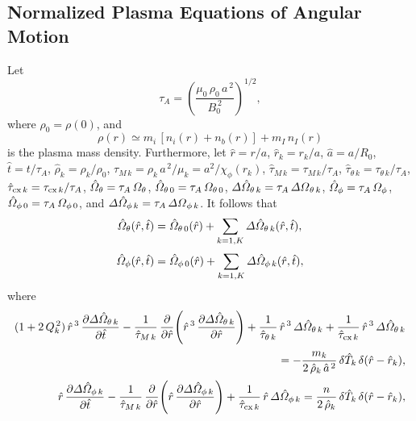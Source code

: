 \documentclass[notitlepage,12pt]{article}
\begin{document}
\subsection{Normalized Plasma Equations of Angular Motion}
Let 
\begin{equation}
\tau_A = \left(\frac{\mu_0\,\rho_0\,a^{\,2}}{B_0^{\,2}}\right)^{1/2},
\end{equation}
where
 $\rho_0=\rho(0)$,
 and
\begin{equation}
\rho(r)
\simeq  m_i\,[n_i(r)+n_b(r)] + m_I\,n_I(r)
\end{equation}
 is the plasma mass density.  
  Furthermore, let $\hat{r}=r/a$, $\hat{r}_k=r_k/a$, $\hat{a}=a/R_0$, $\hat{t}=t/\tau_A$, $\hat{\rho}_k=\rho_k/\rho_0$, $\tau_{M\,k} = \rho_k\,a^{\,2}/\mu_k= a^2/\chi_\phi(r_k)$, $\hat{\tau}_{M\,k}= \tau_{M\,k}/\tau_A$, 
$\hat{\tau}_{\theta\,k}=\tau_{\theta\,k}/\tau_A$, $
\hat{\tau}_{{\rm cx}\,k}=\tau_{{\rm cx}\,k}/\tau_A$, $\hat{\mit\Omega}_\theta=\tau_A\,{\mit\Omega}_\theta$, $\hat{\mit\Omega}_{\theta\,0}=\tau_A\,{\mit\Omega}_{\theta\,0}$,
${\mit\Delta}\hat{\mit\Omega}_{\theta\,k} = \tau_A\,{\mit\Delta\Omega}_{\theta\,k}$, $\hat{\mit\Omega}_\phi=\tau_A\,{\mit\Omega}_\phi$, $\hat{\mit\Omega}_{\phi\,0}=\tau_A\,{\mit\Omega}_{\phi\,0}$,
and 
${\mit\Delta}\hat{\mit\Omega}_{\phi\,k} = \tau_A\,{\mit\Delta\Omega}_{\phi\,k}$. It follows that
\begin{align}
\hat{\mit\Omega}_\theta(\hat{r},\hat{t}) &=\hat{\mit\Omega}_{\theta\,0}(\hat{r}) + \sum_{k=1,K}{\mit\Delta}\hat{\mit\Omega}_{\theta\,k}(\hat{r},\hat{t}),\\[0.5ex]
\hat{\mit\Omega}_\phi(\hat{r},\hat{t}) &=\hat{\mit\Omega}_{\phi\,0}(\hat{r}) + \sum_{k=1,K}{\mit\Delta}\hat{\mit\Omega}_{\phi\,k}(\hat{r},\hat{t}),
\end{align}
where
\begin{align}
(1+2\,Q_k^{\,2})\,\hat{r}^{\,3}\,\frac{\partial{\mit\Delta}\hat{\mit\Omega}_{\theta\,k}}{\partial \hat{t}}-\frac{1}{\hat{\tau}_{M\,k}}\,\frac{\partial}{\partial \hat{r}}\!\left(
\hat{r}^{\,3}\,\frac{\partial{\mit\Delta}\hat{\mit\Omega}_{\theta\,k}}{\partial \hat{r}}\right) +\frac{1}{\hat{\tau}_{\theta\,k}}\,\hat{r}^{\,3}\,{\mit\Delta}\hat{\mit\Omega}_{\theta\,k}+\frac{1}{\hat{\tau}_{{\rm cx}\,k}}\,\hat{r}^{\,3}\,{\mit\Delta}\hat{\mit\Omega}_{\theta\,k}\nonumber\\[0.5ex]\phantom{==}=-\frac{m_k}{2\,\hat{\rho}_k\,\hat{a}^{\,2}}\,\delta\hat{T}_k\,\delta (\hat{r}-\hat{r}_k),\label{exxx}\\[0.5ex]
\hat{r}\,\frac{\partial{\mit\Delta}\hat{\mit\Omega}_{\phi\,k}}{\partial \hat{t}}-\frac{1}{\hat{\tau}_{M\,k}}\,\frac{\partial}{\partial \hat{r}}\!\left(
\hat{r}\,\frac{\partial{\mit\Delta}\hat{\mit\Omega}_{\phi\,k}}{\partial \hat{r}}\right) +\frac{1}{\hat{\tau}_{{\rm cx}\,k}}\,\hat{r}\,{\mit\Delta}\hat{\mit\Omega}_{\phi\,k}
= \frac{n}{2\,\hat{\rho}_k}\,\delta \hat{T}_{k}\,\delta(\hat{r}-\hat{r}_k),\label{eyyy}
\end{align}
\end{document}
